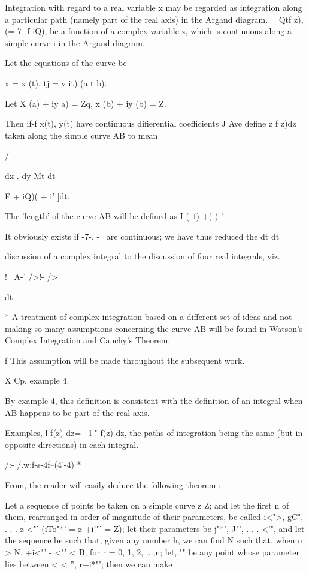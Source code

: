 
Integration with regard to a real variable x may be regarded as
integration along a particular path (namely part of the real axis) in
the Argand diagram. \ \ Qtf z), (= 7 -f iQ), be a function of a
complex variable z, which is continuous along a simple curve i in the
Argand diagram.

Let the equations of the curve be

x = x (t), tj = y it) (a t b).

Let X (a) + iy a) = Zq, x (b) + iy (b) = Z.

Then if-f x(t), y(t) have continuous difierential coefficients J Ave
define z f z)dz taken along the simple curve AB to mean

/

dx . dy Mt dt

 F + iQ)( + i' ]dt.

The 'length' of the curve AB will be defined as I \/ (--f) +( ) ' 

It obviously exists if -7-, -~ are continuous; we have thus reduced
the  dt dt

discussion of a complex integral to the discussion of four real
integrals, viz.

! \ A-' />!- />

dt

* A treatment of complex integration based on a different set of ideas
and not making so many assumptions concerning the curve AB will be
found in Watson's Complex Integration and Cauchy's Theorem.

f This assumption will be made throughout the subsequent work.

X Cp. example 4.

%
%

By example 4, this definition is consistent with the definition
of an integral when AB happens to be part of the real axis.

Examples, l f(z) dz= - l " f(z) dz, the paths of integration being the
same (but in opposite directions) in each integral.

/:- /.w:f-s-4f--(4'-4) *\


From, the reader will easily deduce the following theorem :

Let a sequence of points be taken on a simple curve z Z; and let the
first n of them, rearranged in order of magnitude of their parameters,
be called i<">, gC", . . . z <"' (iTo"*' = z +i'"' = Z); let their
parameters be j"*', J"', . . . <'", and let the sequence be such that,
given any number h, we can find N such that, when n > N, +i<"' - <"' <
B, for r = 0, 1, 2, ...,n; let,."" be any point whose parameter lies
between < < '', r+i*"'; then we can make

